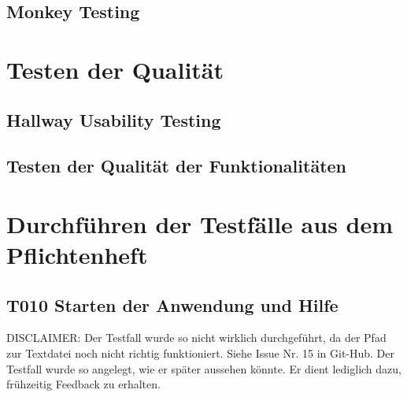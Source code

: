 \documentclass[parskip=full]{scrartcl}
\begin{document}
\subsection{Monkey Testing}

\clearpage
\section{Testen der Qualität} \label{quali}



\subsection{Hallway Usability Testing}


\subsection{Testen der Qualität der Funktionalitäten}


\clearpage
\section{Durchführen der Testfälle aus dem Pflichtenheft} \label{testszenarien}

\subsection{\textbf{T010} Starten der Anwendung und Hilfe}

DISCLAIMER: Der Testfall wurde so nicht wirklich durchgeführt, da der Pfad zur Textdatei noch nicht richtig funktioniert. Siehe Issue Nr. 15 in Git-Hub. Der Testfall wurde so angelegt, wie er später aussehen könnte. Er dient lediglich dazu, frühzeitig Feedback zu erhalten.
\end{document}
